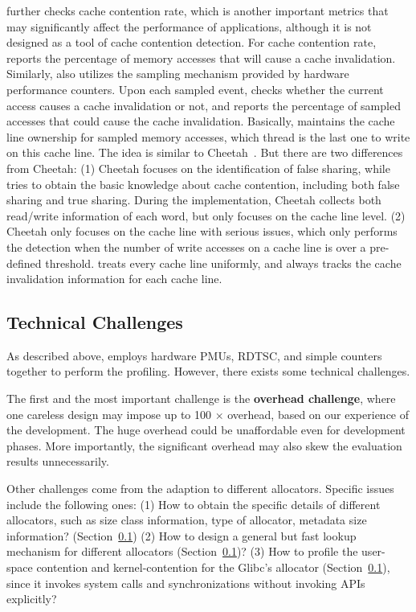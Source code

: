 \MP{} further checks cache contention rate, which is another important metrics that may significantly affect the performance of applications, although it is not designed as a tool of cache contention detection. For cache contention rate, \MP{} reports the percentage of memory accesses that will cause a cache invalidation.  Similarly, \MP{} also utilizes the sampling mechanism provided by hardware performance counters. Upon each sampled event, \MP{} checks whether the current access causes a cache invalidation or not, and reports the percentage of sampled accesses that could cause the cache invalidation. Basically, \MP{} maintains the cache line ownership for sampled memory accesses, which thread is the last one to write on this cache line. The idea is similar to Cheetah~\cite{Cheetah}. But there are two differences from Cheetah: (1) Cheetah focuses on the identification of false sharing, while \MP{} tries to obtain the basic knowledge about cache contention, including both false sharing and true sharing. During the implementation, Cheetah collects both read/write information of each word, but \MP{} only focuses on the cache line level. (2)  Cheetah only focuses on the cache line with serious issues, which only performs the detection when the number of write accesses on a cache line is over a pre-defined threshold. \MP{} treats every cache line uniformly, and always tracks the cache invalidation information for each cache line. 

\subsection{Technical Challenges}

As described above, \MP{} employs hardware PMUs, RDTSC, and simple counters together to perform the profiling. However, there exists some technical challenges. 

The first and the most important challenge is the \textbf{overhead challenge}, where one careless design may impose up to 100 $\times$ overhead, based on our experience of the development. The huge overhead could be unaffordable even for development phases. More importantly, the significant overhead may also skew the evaluation results unnecessarily.

Other challenges come from the adaption to different allocators. Specific issues include the following ones: (1) How to obtain the specific details of different allocators, such as size class information, type of allocator, metadata size information? (Section~\ref{}) (2) How to design a general but fast lookup mechanism for different allocators (Section~\ref{})? (3) How to profile the user-space contention and kernel-contention for the Glibc's allocator (Section~\ref{}), since it invokes system calls and synchronizations without invoking APIs explicitly?








